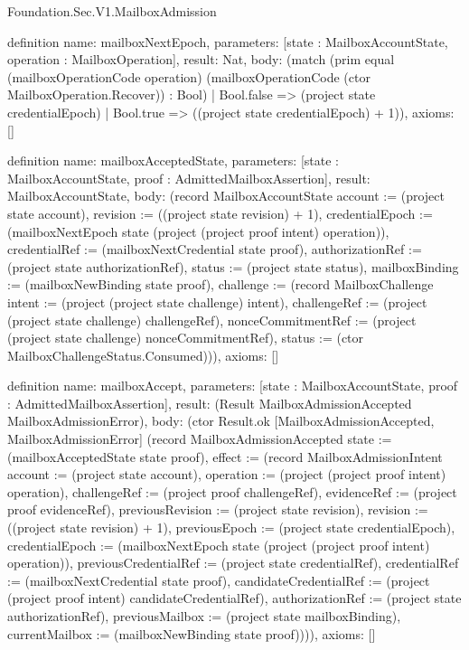 \begin{lexlean}{Foundation.Sec.V1.MailboxAdmission}
\begin{semanticmodule}
definition{
  name: mailboxNextEpoch,
  parameters: [state : MailboxAccountState, operation : MailboxOperation],
  result: Nat,
  body: (match (prim equal (mailboxOperationCode operation) (mailboxOperationCode (ctor MailboxOperation.Recover)) : Bool)
    | Bool.false => (project state credentialEpoch)
    | Bool.true => ((project state credentialEpoch) + 1)),
  axioms: []
}

definition{
  name: mailboxAcceptedState,
  parameters: [state : MailboxAccountState, proof : AdmittedMailboxAssertion],
  result: MailboxAccountState,
  body: (record MailboxAccountState {account := (project state account), revision := ((project state revision) + 1), credentialEpoch := (mailboxNextEpoch state (project (project proof intent) operation)), credentialRef := (mailboxNextCredential state proof), authorizationRef := (project state authorizationRef), status := (project state status), mailboxBinding := (mailboxNewBinding state proof), challenge := (record MailboxChallenge {intent := (project (project state challenge) intent), challengeRef := (project (project state challenge) challengeRef), nonceCommitmentRef := (project (project state challenge) nonceCommitmentRef), status := (ctor MailboxChallengeStatus.Consumed)})}),
  axioms: []
}

definition{
  name: mailboxAccept,
  parameters: [state : MailboxAccountState, proof : AdmittedMailboxAssertion],
  result: (Result MailboxAdmissionAccepted MailboxAdmissionError),
  body: (ctor Result.ok [MailboxAdmissionAccepted, MailboxAdmissionError] (record MailboxAdmissionAccepted {state := (mailboxAcceptedState state proof), effect := (record MailboxAdmissionIntent {account := (project state account), operation := (project (project proof intent) operation), challengeRef := (project proof challengeRef), evidenceRef := (project proof evidenceRef), previousRevision := (project state revision), revision := ((project state revision) + 1), previousEpoch := (project state credentialEpoch), credentialEpoch := (mailboxNextEpoch state (project (project proof intent) operation)), previousCredentialRef := (project state credentialRef), credentialRef := (mailboxNextCredential state proof), candidateCredentialRef := (project (project proof intent) candidateCredentialRef), authorizationRef := (project state authorizationRef), previousMailbox := (project state mailboxBinding), currentMailbox := (mailboxNewBinding state proof)})})),
  axioms: []
}


\end{semanticmodule}
\end{lexlean}
